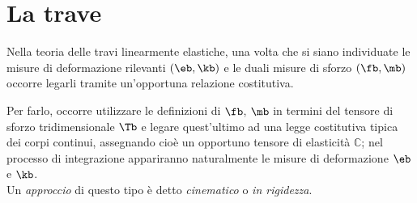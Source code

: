 \chapter{La trave}\label{const_trave}

Nella teoria delle travi linearmente elastiche, una volta che si siano individuate le misure di deformazione rilevanti $(\eb,\kb)$ e le duali misure di sforzo $(\fb,\mb)$ occorre legarli tramite un'opportuna relazione costitutiva.




Per farlo, occorre utilizzare le definizioni di $\fb$, $\mb$ in termini del tensore di sforzo tridimensionale $\Tb$ e legare quest'ultimo ad una legge costitutiva tipica dei corpi continui, assegnando cioè un opportuno tensore di elasticità $\mathbb{C}$; nel processo di integrazione appariranno naturalmente le misure di deformazione $\eb$ e $\kb$.
 \\Un \textit{approccio} di questo tipo è detto \textit{cinematico} o \textit{in rigidezza}.


